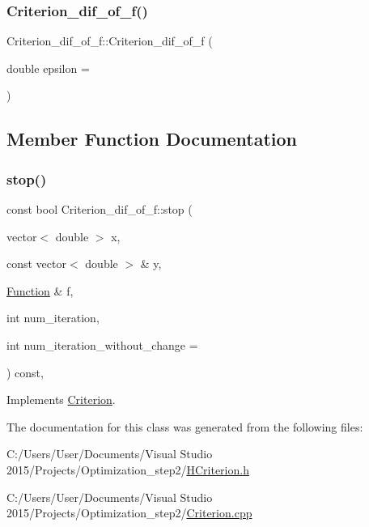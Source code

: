 \subsubsection{\texorpdfstring{Criterion\+\_\+dif\+\_\+of\+\_\+f()}{Criterion\_dif\_of\_f()}}
{\footnotesize\ttfamily Criterion\+\_\+dif\+\_\+of\+\_\+f\+::\+Criterion\+\_\+dif\+\_\+of\+\_\+f (\begin{DoxyParamCaption}\item[{double}]{epsilon = {} }\end{DoxyParamCaption})\hspace{0.3cm}{\ttfamily [inline]}}



\subsection{Member Function Documentation}
\mbox{\label{class_criterion__dif__of__f_a0bea2c48766a1db63ec9d3ba7cf08767}} 
\subsubsection{\texorpdfstring{stop()}{stop()}}
{\footnotesize\ttfamily const bool Criterion\+\_\+dif\+\_\+of\+\_\+f\+::stop (\begin{DoxyParamCaption}\item[{vector$<$ double $>$}]{x,  }\item[{const vector$<$ double $>$ \&}]{y,  }\item[{\hyperlink{class_function}{Function} \&}]{f,  }\item[{int}]{num\+\_\+iteration,  }\item[{int}]{num\+\_\+iteration\+\_\+without\+\_\+change = {} }\end{DoxyParamCaption}) const\hspace{0.3cm}{\ttfamily [override]}, {\ttfamily [virtual]}}



Implements \hyperlink{class_criterion_aee3e2148c665c72c50c2f870a3ca8cdc}{Criterion}.



The documentation for this class was generated from the following files\+:\begin{DoxyCompactItemize}
\item 
C\+:/\+Users/\+User/\+Documents/\+Visual Studio 2015/\+Projects/\+Optimization\+\_\+step2/\hyperlink{_h_criterion_8h}{H\+Criterion.\+h}\item 
C\+:/\+Users/\+User/\+Documents/\+Visual Studio 2015/\+Projects/\+Optimization\+\_\+step2/\hyperlink{_criterion_8cpp}{Criterion.\+cpp}\end{DoxyCompactItemize}
